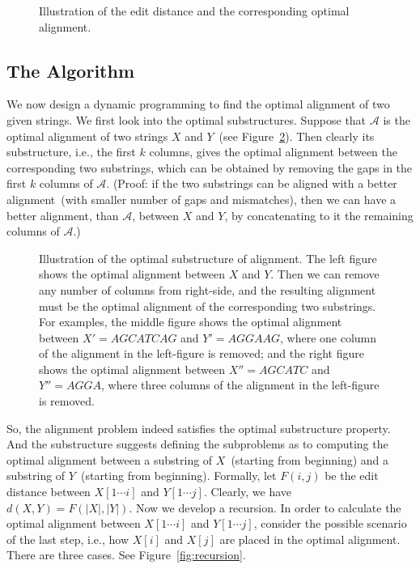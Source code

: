 \begin{figure}[h]
\centering{}
\caption{Illustration of the edit distance and the corresponding optimal alignment.}
\label{fig:align}
\end{figure}


\subsection*{The Algorithm}

We now design a dynamic programming to find the optimal alignment of two given strings.
We first look into the optimal substructures. Suppose that $\mathcal{A}$ is the optimal
alignment of two strings $X$ and $Y$~(see Figure~\ref{fig:optimal}).
Then clearly its substructure, i.e., the first $k$ columns, gives the optimal
alignment between the corresponding two substrings, which can be obtained by removing
the gaps in the first $k$ columns of $\mathcal{A}$.
(Proof: if the two substrings can be aligned with
a better alignment~(with smaller number of gaps and mismatches), then we can have
a better alignment, than $\mathcal{A}$, between $X$ and $Y$,
by concatenating to it the remaining columns of $\mathcal{A}$.)

\begin{figure}[h]
\centering{}
\caption{Illustration of the optimal substructure of alignment.
The left figure shows the optimal alignment between $X$ and $Y$.
Then we can remove any number of columns from right-side, and the resulting
alignment must be the optimal alignment of the corresponding two substrings.
For examples, the middle figure shows the optimal alignment between $X' = AGCATCAG$ and $Y' = AGGAAG$,
where one column of the alignment in the left-figure is removed;
and the right figure shows the optimal alignment between $X'' = AGCATC$ and $Y'' = AGGA$,
where three columns of the alignment in the left-figure is removed.}
\label{fig:optimal}
\end{figure}

So, the alignment problem indeed satisfies the optimal substructure property.
And the substructure suggests defining the subproblems as to computing the optimal
alignment between a substring of $X$~(starting from beginning) and 
a substring of $Y$~(starting from beginning).
Formally, let $F(i,j)$ be the edit distance between $X[1\cdots i]$ and $Y[1\cdots j]$.
Clearly, we have $d(X, Y) = F(|X|, |Y|)$.
Now we develop a recursion. In order to calculate the optimal alignment between $X[1\cdots i]$
and $Y[1\cdots j]$, consider the possible scenario of the last step, i.e., how $X[i]$ and $X[j]$
are placed in the optimal alignment. There are three cases. See Figure~\ref{fig:recursion}.

